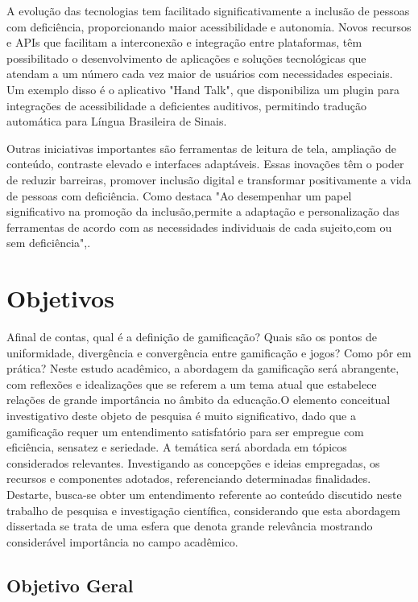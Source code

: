 A evolução das tecnologias tem facilitado significativamente a inclusão de pessoas com deficiência, proporcionando maior acessibilidade e autonomia. Novos recursos e APIs que facilitam a interconexão e integração entre plataformas, têm possibilitado o desenvolvimento de aplicações e soluções tecnológicas que atendam a um número cada vez maior de usuários com necessidades especiais. Um exemplo disso é o aplicativo "Hand Talk", que disponibiliza um plugin para integrações de acessibilidade a deficientes auditivos, permitindo tradução automática para Língua Brasileira de Sinais.

Outras iniciativas importantes são ferramentas de leitura de tela, ampliação de conteúdo, contraste elevado e interfaces adaptáveis. Essas inovações têm o poder de reduzir barreiras, promover inclusão digital e transformar positivamente a vida de pessoas com deficiência. Como destaca  \cite{cordeiro2023inclusao} "Ao desempenhar um papel significativo na promoção da inclusão,permite a adaptação e personalização das ferramentas de acordo com as necessidades individuais de cada sujeito,com ou sem deficiência",.


\section{Objetivos}

Afinal de contas, qual é a definição de gamificação? Quais são os pontos de uniformidade, divergência e convergência entre gamificação e jogos? Como pôr em prática? Neste estudo acadêmico, a abordagem da gamificação será abrangente, com reflexões e idealizações que se referem a um tema atual que estabelece relações de grande importância no âmbito da educação.O elemento conceitual investigativo deste objeto de pesquisa é muito significativo, dado que a gamificação requer um entendimento satisfatório para ser empregue com eficiência, sensatez e seriedade. A temática será abordada em tópicos considerados relevantes. Investigando as concepções e ideias empregadas, os recursos e componentes adotados, referenciando determinadas finalidades. Destarte, busca-se obter um entendimento referente ao conteúdo discutido neste trabalho de pesquisa e investigação científica, considerando que esta abordagem dissertada se trata de uma esfera que denota grande relevância mostrando considerável importância no campo acadêmico.


\subsection{Objetivo Geral}

